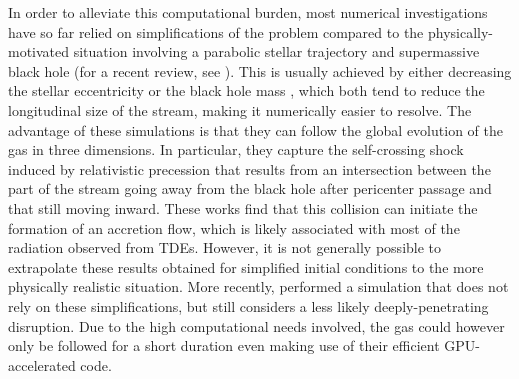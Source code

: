 \documentclass[a4paper,fleqn,usenatbib]{mnras}
\begin{document}
In order to alleviate this computational burden, most numerical investigations have so far relied on simplifications of the problem compared to the physically-motivated situation involving a parabolic stellar trajectory and supermassive black hole (for a recent review, see \citet{bonnerot2021-review}). This is usually achieved by either decreasing the stellar eccentricity \citep{hayasaki2013,bonnerot2016-circ,sadowski2016} or the black hole mass \citep{rosswog2009,guillochon2014-10jh,shiokawa2015}, which both tend to reduce the longitudinal size of the stream, making it numerically easier to resolve. The advantage of these simulations is that they can follow the global evolution of the gas in three dimensions. In particular, they capture the self-crossing shock induced by relativistic precession that results from an intersection between the part of the stream going away from the black hole after pericenter passage and that still moving inward. These works find that this collision can initiate the formation of an accretion flow, which is likely associated with most of the radiation observed from TDEs. However, it is not generally possible to extrapolate these results obtained for simplified initial conditions to the more physically realistic situation. More recently, \cite{andalman2020} performed a simulation that does not rely on these simplifications, but still considers a less likely deeply-penetrating disruption. Due to the high computational needs involved, the gas could however only be followed for a short duration even making use of their efficient GPU-accelerated code.
\end{document}

